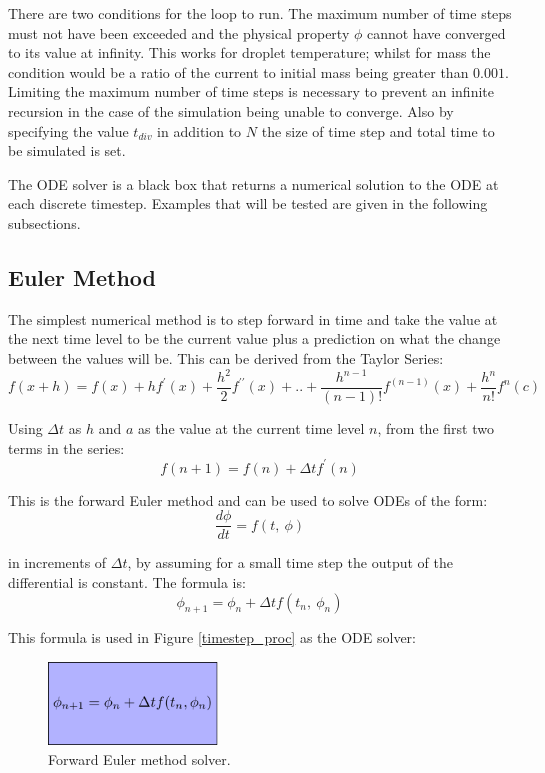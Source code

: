 \documentclass[../Interim_Report_Master]{subfiles}
\begin{document}
There are two conditions for the loop to run. The maximum number of time steps must not have been exceeded and the physical property $\phi$ cannot have converged to its value at infinity. This works for droplet temperature; whilst for mass the condition would be a ratio of the current to initial mass being greater than $0.001$. Limiting the maximum number of time steps is necessary to prevent an infinite recursion in the case of the simulation being unable to converge. Also by specifying the value $t_{div}$ in addition to $N$ the size of time step and total time to be simulated is set.

The ODE solver is a black box that returns a numerical solution to the ODE at each discrete timestep. Examples that will be tested are given in the following subsections.

\subsection{Euler Method}
The simplest numerical method is to step forward in time and take the value at the next time level to be the current value plus a prediction on what the change between the values will be. This can be derived from the Taylor Series:
\begin{equation}
f(x+h) = f(x)+hf^\prime(x)+\frac{h^2}{2}f^{\prime\prime}(x)+..+\frac{h^{n-1}}{(n-1)!}f^{(n-1)}(x)+\frac{h^n}{n!}f^n(c)
\end{equation}

Using $\Delta t$ as $h$ and $a$ as the value at the current time level $n$, from the first two terms in the series:
\begin{equation}
f(n+1) = f(n)+\Delta tf^\prime(n)
\end{equation}

This is the forward Euler method and can be used to solve ODEs of the form:
\begin{equation}
\frac{d\phi}{dt} = f(t,~\phi)
\end{equation}

in increments of \(\Delta t\), by assuming for a small time step the output of the differential is constant. The formula is:
\begin{equation}
\phi_{n+1} = \phi_n + \Delta tf(t_n,~\phi_n)
\end{equation}

This formula is used in Figure \ref{timestep_proc} as the ODE solver:
\begin{figure}
	\centering
	\includegraphics[width=0.4\textwidth]{./Diagrams/Forward_Euler_Method_Flowchart/Forward_Euler_Method_Flowchart.pdf}
	\caption{Forward Euler method solver.}
	\label{forward_euler}
\end{figure}
\end{document}
